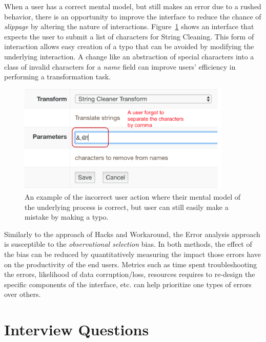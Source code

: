 \documentclass[12pt,letterpaper]{article}
\begin{document}
When a user has a correct mental model, but still makes an error due to a rushed behavior, there is an opportunity to improve the interface to reduce the chance of \textit{slippage} by altering the nature of interactions. Figure~\ref{fig::6} shows an interface that expects the user to submit a list of characters for String Cleaning. This form of interaction allows easy creation of a typo that can be avoided by modifying the underlying interaction. A change like an abstraction of special characters into a class of invalid characters for a \textit{name} field can improve users' efficiency in performing a transformation task.

\begin{figure}[h]
\centering
\includegraphics[width=4in, scale=.3]{slip.png}
\caption{An example of the incorrect user action where their mental model of the underlying process is correct, but user can still easily make a mistake by making a typo.}
\label{fig::6}
\end{figure}

Similarly to the approach of Hacks and Workaround, the Error analysis approach is susceptible to the \textit{observational selection} bias. In both methods, the effect of the bias can be reduced by quantitatively measuring the impact those errors have on the productivity of the end users. Metrics such as time spent troubleshooting the errors, likelihood of data corruption/loss, resources requires to re-design the specific components of the interface, etc. can help prioritize one types of errors over others.  






 


\appendix

\section{Interview Questions}
\end{document}
